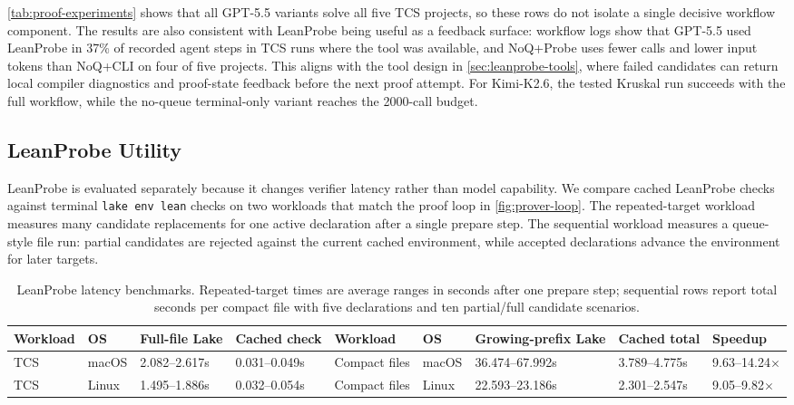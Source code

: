 \documentclass{article}
\newcommand{\kimi}{Kimi-K2.6\xspace}
\newcommand{\gpt}{GPT-5.5\xspace}
\begin{document}
\cref{tab:proof-experiments} shows that all \gpt variants solve all five TCS projects, so these rows do not isolate a single decisive workflow component.
The results are also consistent with LeanProbe being useful as a feedback surface: workflow logs show that \gpt used LeanProbe in 37\% of recorded agent steps in TCS runs where the tool was available, and NoQ+Probe uses fewer calls and lower input tokens than NoQ+CLI on four of five projects.
This aligns with the tool design in \cref{sec:leanprobe-tools}, where failed candidates can return local compiler diagnostics and proof-state feedback before the next proof attempt.
For \kimi, the tested Kruskal run succeeds with the full workflow, while the no-queue terminal-only variant reaches the 2000-call budget.

\subsection{LeanProbe Utility}

LeanProbe is evaluated separately because it changes verifier latency rather than model capability.
We compare cached LeanProbe checks against terminal \texttt{lake env lean} checks on two workloads that match the proof loop in \cref{fig:prover-loop}.
The repeated-target workload measures many candidate replacements for one active declaration after a single prepare step.
The sequential workload measures a queue-style file run: partial candidates are rejected against the current cached environment, while accepted declarations advance the environment for later targets.

\begin{table}[t]
\centering
\caption{LeanProbe latency benchmarks. Repeated-target times are average ranges in seconds after one prepare step; sequential rows report total seconds per compact file with five declarations and ten partial/full candidate scenarios.}
\label{tab:leanprobe-summary}
\footnotesize
\setlength{\tabcolsep}{3pt}
\begin{tabular}{@{}llll@{\hspace{7mm}}lllll@{}}
\toprule
Workload & OS & Full-file Lake & Cached check &
Workload & OS & Growing-prefix Lake & Cached total & Speedup \\
\midrule
TCS & macOS & 2.082--2.617s & 0.031--0.049s &
Compact files & macOS & 36.474--67.992s & 3.789--4.775s & 9.63--14.24$\times$ \\
TCS & Linux & 1.495--1.886s & 0.032--0.054s &
Compact files & Linux & 22.593--23.186s & 2.301--2.547s & 9.05--9.82$\times$ \\
\bottomrule
\end{tabular}
\end{table}
\end{document}
